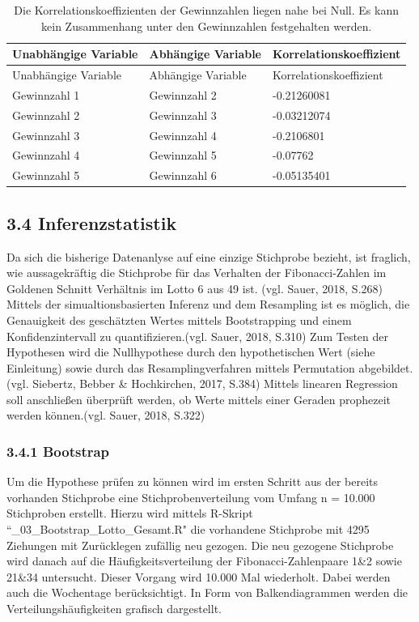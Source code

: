 \documentclass[ngerman,]{article}
\begin{document}
\begin{longtable}[]{@{}lll@{}}
\caption{Die Korrelationskoeffizienten der Gewinnzahlen liegen nahe bei
Null. Es kann kein Zusammenhang unter den Gewinnzahlen festgehalten
werden.}\tabularnewline
\toprule
Unabhängige Variable & Abhängige Variable &
Korrelationskoeffizient\tabularnewline
\midrule
\endfirsthead
\toprule
Unabhängige Variable & Abhängige Variable &
Korrelationskoeffizient\tabularnewline
\midrule
\endhead
Gewinnzahl 1 & Gewinnzahl 2 & -0.21260081\tabularnewline
Gewinnzahl 2 & Gewinnzahl 3 & -0.03212074\tabularnewline
Gewinnzahl 3 & Gewinnzahl 4 & -0.2106801\tabularnewline
Gewinnzahl 4 & Gewinnzahl 5 & -0.07762\tabularnewline
Gewinnzahl 5 & Gewinnzahl 6 & -0.05135401\tabularnewline
\bottomrule
\end{longtable}

\subsection{3.4 Inferenzstatistik}\label{inferenzstatistik}

Da sich die bisherige Datenanlyse auf eine einzige Stichprobe bezieht,
ist fraglich, wie aussagekräftig die Stichprobe für das Verhalten der
Fibonacci-Zahlen im Goldenen Schnitt Verhältnis im Lotto 6 aus 49 ist.
(vgl. Sauer, 2018, S.268) Mittels der simualtionsbasierten Inferenz und
dem Resampling ist es möglich, die Genauigkeit des geschätzten Wertes
mittels Bootstrapping und einem Konfidenzintervall zu
quantifizieren.(vgl. Sauer, 2018, S.310) Zum Testen der Hypothesen wird
die Nullhypothese durch den hypothetischen Wert (siehe Einleitung) sowie
durch das Resamplingverfahren mittels Permutation abgebildet. (vgl.
Siebertz, Bebber \& Hochkirchen, 2017, S.384) Mittels linearen
Regression soll anschließen überprüft werden, ob Werte mittels einer
Geraden prophezeit werden können.(vgl. Sauer, 2018, S.322)

\subsubsection{3.4.1 Bootstrap}\label{bootstrap}

Um die Hypothese prüfen zu können wird im ersten Schritt aus der bereits
vorhanden Stichprobe eine Stichprobenverteilung vom Umfang n = 10.000
Stichproben erstellt. Hierzu wird mittels R-Skript
``\_03\_Bootstrap\_Lotto\_Gesamt.R" die vorhandene Stichprobe mit 4295
Ziehungen mit Zurücklegen zufällig neu gezogen. Die neu gezogene
Stichprobe wird danach auf die Häufigkeitsverteilung der
Fibonacci-Zahlenpaare 1\&2 sowie 21\&34 untersucht. Dieser Vorgang wird
10.000 Mal wiederholt. Dabei werden auch die Wochentage berücksichtigt.
In Form von Balkendiagrammen werden die Verteilungshäufigkeiten grafisch
dargestellt.
\end{document}
